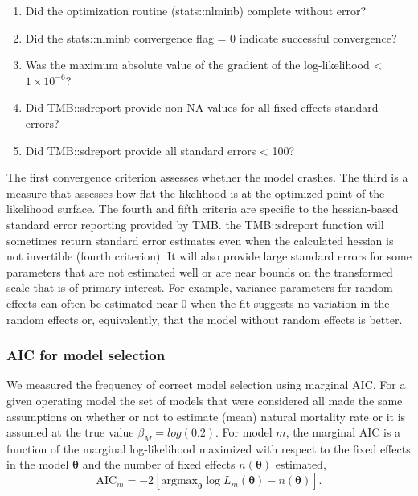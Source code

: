 \documentclass[
  12pt,
]{article}
\begin{document}
\begin{enumerate}
\item Did the optimization routine (stats::nlminb) complete without error?
\item Did the stats::nlminb convergence flag = 0 indicate successful convergence?
\item Was the maximum absolute value of the gradient of the log-likelihood < $1\times10^{-6}$?
\item Did TMB::sdreport provide non-NA values for all fixed effects standard errors?
\item Did TMB::sdreport provide all standard errors < 100?
\end{enumerate}

The first convergence criterion assesses whether the model crashes. The
third is a measure that assesses how flat the likelihood is at the
optimized point of the likelihood surface. The fourth and fifth criteria
are specific to the hessian-based standard error reporting provided by
TMB. the TMB::sdreport function will sometimes return standard error
estimates even when the calculated hessian is not invertible (fourth
criterion). It will also provide large standard errors for some
parameters that are not estimated well or are near bounds on the
transformed scale that is of primary interest. For example, variance
parameters for random effects can often be estimated near 0 when the fit
suggests no variation in the random effects or, equivalently, that the
model without random effects is better.

\hypertarget{aic-for-model-selection}{%
\subsubsection*{AIC for model selection}\label{aic-for-model-selection}}

We measured the frequency of correct model selection using marginal AIC.
For a given operating model the set of models that were considered all
made the same assumptions on whether or not to estimate (mean) natural
mortality rate or it is assumed at the true value
\(\beta_M = log(0.2)\). For model \(m\), the marginal AIC is a function
of the marginal log-likelihood maximized with respect to the fixed
effects in the model \(\boldsymbol{\theta}\) and the number of fixed
effects \(n\left(\boldsymbol{\theta}\right)\) estimated, \[
\text{AIC}_m = -2\left[{\text{argmax}}_{\boldsymbol{\theta}} \log L_m\left({\boldsymbol{\theta}}\right) - n\left({\boldsymbol{\theta}}\right)\right].
\]
\end{document}
